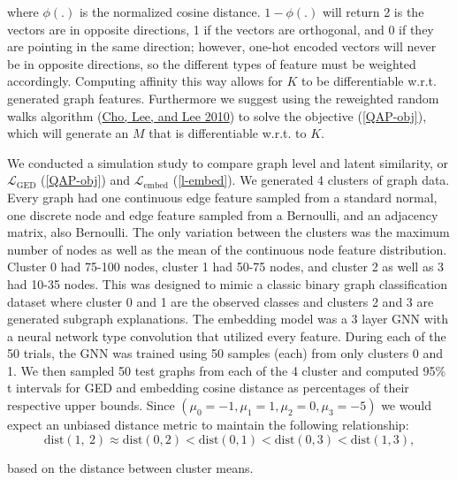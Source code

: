\documentclass[
  11pt,
  letterpaper,
]{article}
\begin{document}
where \(\phi(.)\) is the normalized cosine distance. \(1 - \phi(.)\)
will return 2 is the vectors are in opposite directions, 1 if the
vectors are orthogonal, and 0 if they are pointing in the same
direction; however, one-hot encoded vectors will never be in opposite
directions, so the different types of feature must be weighted
accordingly. Computing affinity this way allows for \(K\) to be
differentiable w.r.t. generated graph features. Furthermore we suggest
using the reweighted random walks algorithm
(\protect\hyperlink{ref-Cho_Lee_Lee_2010}{Cho, Lee, and Lee 2010}) to
solve the objective (\ref{QAP-obj}), which will generate an \(M\) that
is differentiable w.r.t. to \(K\).

\quad We conducted a simulation study to compare graph level and latent
similarity, or \(\mathcal{L}_{\text{GED}}\) (\ref{QAP-obj}) and
\(\mathcal{L}_{\text{embed}}\) (\ref{l-embed}). We generated 4 clusters
of graph data. Every graph had one continuous edge feature sampled from
a standard normal, one discrete node and edge feature sampled from a
Bernoulli, and an adjacency matrix, also Bernoulli. The only variation
between the clusters was the maximum number of nodes as well as the mean
of the continuous node feature distribution. Cluster 0 had 75-100 nodes,
cluster 1 had 50-75 nodes, and cluster 2 as well as 3 had 10-35 nodes.
This was designed to mimic a classic binary graph classification dataset
where cluster 0 and 1 are the observed classes and clusters 2 and 3 are
generated subgraph explanations. The embedding model was a 3 layer GNN
with a neural network type convolution that utilized every feature.
During each of the 50 trials, the GNN was trained using 50 samples
(each) from only clusters 0 and 1. We then sampled 50 test graphs from
each of the 4 cluster and computed 95\% t intervals for GED and
embedding cosine distance as percentages of their respective upper
bounds. Since \((\mu_0 = -1, \mu_1 = 1, \mu_2 = 0, \mu_3 = -5)\) we
would expect an unbiased distance metric to maintain the following
relationship:\\
\begin{equation}
    \text{dist}(1,\ 2) \approx \text{dist}(0, 2) < \text{dist}(0, 1) < \text{dist}(0, 3) < \text{dist}(1, 3), 
\end{equation}

based on the distance between cluster means.
\end{document}
